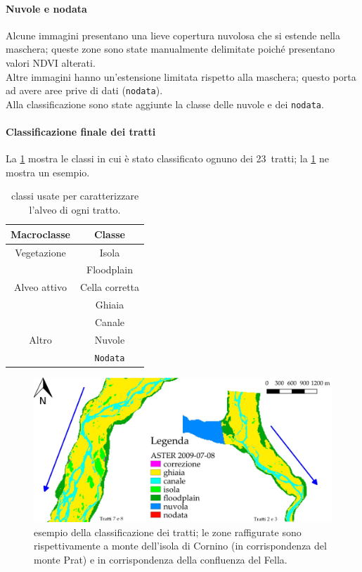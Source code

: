 \paragraph{Nuvole e nodata}
Alcune immagini presentano una lieve copertura nuvolosa che si estende nella maschera; queste zone sono state manualmente delimitate poiché presentano valori NDVI alterati.
\\
Altre immagini hanno un'estensione limitata rispetto alla maschera; questo porta ad avere aree prive di dati (\texttt{nodata}).
\\
Alla classificazione sono state aggiunte la classe delle nuvole e dei \texttt{nodata}.
%
%
\paragraph{Classificazione finale dei tratti}
La \cref{tab:class-tratti} mostra le classi in cui è stato classificato ognuno dei 23~tratti; la \cref{fig:class-is-fl} ne mostra un esempio.
%
\begin{table}
	\centering
	\begin{tabular}{
		c 
		c
		}
		\toprule
		\textbf{Macroclasse}	&	\textbf{Classe}	\\
		\midrule
		Vegetazione		&	Isola	\\
						&	Floodplain	\\
		\midrule
		Alveo attivo	&	Cella corretta	\\
						&	Ghiaia	\\
						&	Canale	\\
		\midrule
		Altro			&	Nuvole	\\
						&	\texttt{Nodata}	\\
		\bottomrule
	\end{tabular}
	\caption[classi utilizzate per caratterizzare l'alveo dei tratti]{classi usate per caratterizzare l'alveo di ogni tratto.}
	\label{tab:class-tratti}
\end{table}
%
\begin{figure}
	\centering
	\includegraphics[width=\textwidth]{files/esempio_class_is_fl.jpeg}
	\caption[esempio della classificazione dei tratti]{esempio della classificazione dei tratti; le zone raffigurate sono rispettivamente a monte dell'isola di Cornino (in corrispondenza del monte Prat) e in corrispondenza della confluenza del Fella.}
	\label{fig:class-is-fl}
\end{figure}
%
%
%
